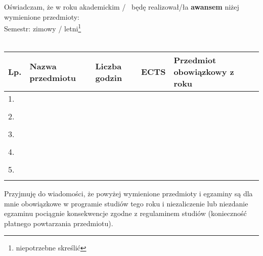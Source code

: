 \documentclass{wmiisubmission}
\begin{document}
\cracowdate
{}
\studentaddress
\addressee{\piotrniemiec}

\vskip 1.6cm

Oświadczam, że w roku akademickim \fillField{1.2cm}/\fillField{1.2cm}~ będę realizował/ła
\textbf{awansem} niżej
wymienione przedmioty:\\

\noindent
Semestr: zimowy / letni\footnote[1]{niepotrzebne skreślić}\\\\

\begin{tabularx}{\textwidth}{|l|X|l|l|l|}

    \hline
    \textbf{Lp.} & \textbf{Nazwa przedmiotu} \hspace{0.9cm} & \small{\textbf{Liczba godzin}} & \textbf{ECTS} & \footnotesize{\textbf{Przedmiot obowiązkowy z roku}} \\
    \hline
    1.  &   &   &  &\\
        &   &   &  &\\
    \hline
    2.  &   &   &  &\\
        &   &   &  &\\
    \hline
    3.  &   &   &  &\\
        &   &   &  &\\
    \hline
    4.  &   &   &  &\\
        &   &   &  &\\
    \hline
    5.  &   &   &  &\\
        &   &   &  &\\
    \hline

\end{tabularx}

\vskip 1.4cm

Przyjmuję do wiadomości, że powyżej wymienione przedmioty i egzaminy są dla mnie
obowiązkowe w programie studiów tego roku i niezaliczenie lub niezdanie egzaminu
pociągnie konsekwencje zgodne z regulaminem studiów (konieczność płatnego
powtarzania przedmiotu).

\vskip 1.6cm

\studentsignature

\vskip 1.5cm

\end{document}
